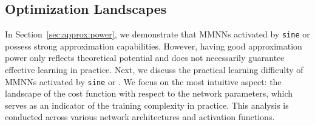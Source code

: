 \documentclass[11pt,a4paper]{article}
\begin{document}
	
	
	










\subsection{Optimization Landscapes}
\label{sec:landscape}


In Section~\ref{sec:approx:power}, we demonstrate that MMNNs activated by \texttt{sine} or  possess strong approximation capabilities. However, having good approximation power only reflects theoretical potential and does not necessarily guarantee effective learning in practice. 
Next, we discuss the practical learning difficulty of MMNNs activated by \texttt{sine} or . We focus on the most intuitive aspect: the landscape of the cost function with respect to the network parameters, which serves as an indicator of the training complexity in practice. This analysis is conducted across various network architectures and activation functions.
 
\end{document}
